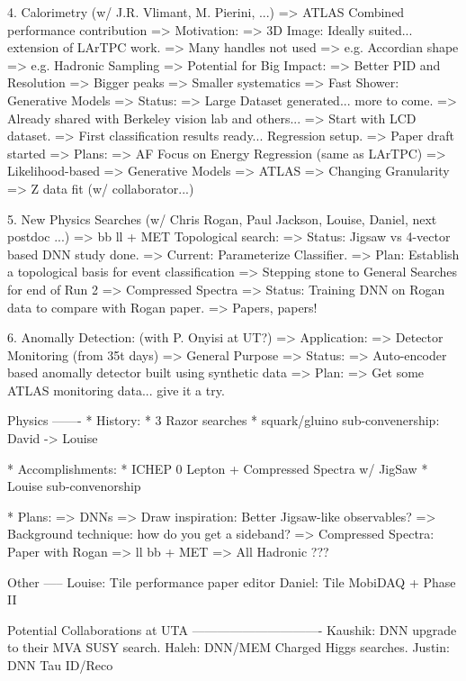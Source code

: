 4. Calorimetry (w/ J.R. Vlimant, M. Pierini, ...) => ATLAS Combined performance contribution
   => Motivation: 
      => 3D Image: Ideally suited... extension of LArTPC work.
      => Many handles not used
         => e.g. Accordian shape
         => e.g. Hadronic Sampling
      => Potential for Big Impact:
         => Better PID and Resolution => Bigger peaks
         => Smaller systematics
      => Fast Shower: Generative Models 
   => Status:
      => Large Dataset generated... more to come.
         => Already shared with Berkeley vision lab and others...
      => Start with LCD dataset.
         => First classification results ready... Regression setup.
         => Paper draft started
   => Plans:
      => AF Focus on Energy Regression (same as LArTPC)
         => Likelihood-based
      => Generative Models
      => ATLAS
         => Changing Granularity 
         => Z data fit (w/ collaborator...)

5. New Physics Searches (w/ Chris Rogan, Paul Jackson, Louise, Daniel, next postdoc ...)
   => bb ll + MET Topological search:
      => Status: Jigsaw vs 4-vector based DNN study done.
         => Current: Parameterize Classifier. 
      => Plan: Establish a topological basis for event classification 
         => Stepping stone to General Searches for end of Run 2
   => Compressed Spectra
      => Status: Training DNN on Rogan data to compare with Rogan paper. 
   => Papers, papers!

6. Anomally Detection: (with P. Onyisi at UT?)
   => Application:
      => Detector Monitoring (from 35t days)
      => General Purpose
   => Status:
      => Auto-encoder based anomally detector built using synthetic data
   => Plan:
      => Get some ATLAS monitoring data... give it a try.


Physics
-------
* History:
   * 3 Razor searches
   * squark/gluino sub-convenership: David -> Louise

* Accomplishments:
   * ICHEP 0 Lepton + Compressed Spectra w/ JigSaw
   * Louise sub-convenorship

* Plans: 
   => DNNs 
      => Draw inspiration: Better Jigsaw-like observables?
      => Background technique: how do you get a sideband?
   => Compressed Spectra: Paper with Rogan
   => ll bb + MET
   => All Hadronic ???

Other
-----
Louise: Tile performance paper editor
Daniel: Tile MobiDAQ + Phase II


Potential Collaborations at UTA
-------------------------------
Kaushik: DNN upgrade to their MVA SUSY search. 
Haleh: DNN/MEM Charged Higgs searches.
Justin: DNN Tau ID/Reco



